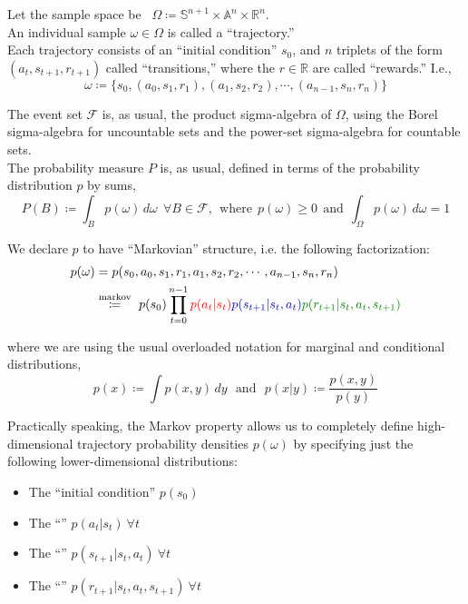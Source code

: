 Let the sample space be \ $\Omega \coloneqq \mathbb{S}^{n+1} \times \mathbb{A}^n \times \mathbb{R}^n$.\\
An individual sample $\omega \in \Omega$ is called a ``trajectory.''\\

Each trajectory consists of an ``initial condition'' $s_0$, and $n$ triplets of the form $(a_t, s_{t+1}, r_{t+1})$ called ``transitions,'' where the $r \in \mathbb{R}$ are called ``rewards.'' I.e.,
\begin{equation*}
\omega \coloneqq \{s_0, (a_0, s_1, r_1), (a_1, s_2, r_2), \cdots, (a_{n-1}, s_{n}, r_n)\}
\end{equation*}

The event set $\mathcal{F}$ is, as usual, the product sigma-algebra of $\Omega$, using the Borel sigma-algebra for uncountable sets and the power-set sigma-algebra for countable sets.\\

The probability measure $P$ is, as usual, defined in terms of the probability distribution $p$ by sums,
\begin{equation*}
P(B) \coloneqq \int_B p(\omega)\, d\omega\ \ \forall B \in \mathcal{F},\ \ \text{where}\ \ p(\omega)\geq0\ \ \text{and}\ \ \int_\Omega p(\omega)\,d\omega = 1
\end{equation*}

We declare $p$ to have ``Markovian'' structure, i.e. the following factorization:
\begin{align*}
p(\omega) &= p(s_0, a_0, s_1, r_1, a_1, s_2, r_2, \cdots, a_{n-1}, s_{n}, r_n)\\
&\stackrel{\text{markov}}{\coloneqq}\ p(s_0) \prod_{t=0}^{n-1} \red{p(a_t|s_t)}\blue{p(s_{t+1}|s_t,a_t)}\green{p(r_{t+1}|s_t,a_t,s_{t+1})}
\end{align*}

where we are using the usual overloaded notation for marginal and conditional distributions,\\
\begin{equation*}
p(x) \coloneqq \int p(x,y)\,dy\ \ \ \text{and}\ \ \ p(x|y) \coloneqq \frac{p(x,y)}{p(y)}
\end{equation*}

Practically speaking, the Markov property allows us to completely define high-dimensional trajectory probability densities $p(\omega)$ by specifying just the following lower-dimensional distributions:
\begin{itemize}
  \item The ``initial condition'' $p(s_0)$
  \item The ``'' $p(a_t|s_t)\ \forall t$
  \item The ``'' $p(s_{t+1}|s_t,a_t)\ \forall t$
  \item The ``'' $p(r_{t+1}|s_t,a_t,s_{t+1})\ \forall t$
\end{itemize}

